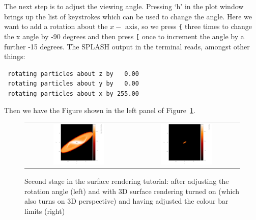 \documentclass[a4paper,10pt]{article}
\newcommand{\splash}{\textsc{SPLASH }}
\begin{document}
The next step is to adjust the viewing angle. Pressing `h' in the plot window brings up the list of keystrokes which can be used to change the angle. Here we want to add a rotation about the $x-$ axis, so we press \verb+{+ three times to change the x angle by -90 degrees and then press \verb+[+ once to increment the angle by a further -15 degrees. The \splash output in the terminal reads, amongst other things:
\begin{verbatim}
 rotating particles about z by   0.00
 rotating particles about y by   0.00
 rotating particles about x by 255.00
\end{verbatim}
Then we have the Figure shown in the left panel of Figure~\ref{fig:surfpart2}.
\begin{figure}[h]
\begin{center}
\begin{tabular}{cc}
\includegraphics[width=0.5\textwidth]{surfpart3.png} &
\includegraphics[width=0.5\textwidth]{surfpart4.png}
\end{tabular}
\caption{Second stage in the surface rendering tutorial: after adjusting the rotation angle (left) and with 3D surface rendering turned on (which also turns on 3D perspective) and having adjusted the colour bar limits (right)}
\label{fig:surfpart2}
\end{center}
\end{figure}
\end{document}

